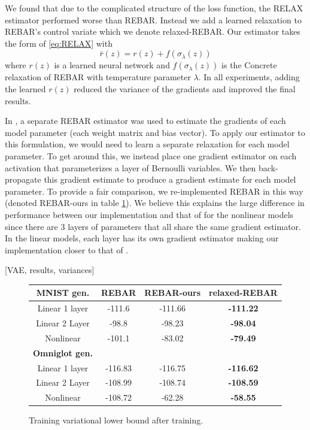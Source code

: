 \documentclass{article}
\newcommand{\relaxed}{r}
\begin{document}
We found that due to the complicated structure of the loss function, the RELAX estimator performed worse than REBAR. Instead we add a learned relaxation to REBAR's control variate which we denote relaxed-REBAR. Our estimator takes the form of \ref{eq:RELAX} with $$\bar \relaxed(z) = \relaxed(z) + f(\sigma_\lambda(z))$$ where $\relaxed(z)$ is a learned neural network and $f(\sigma_\lambda(z))$ is the Concrete relaxation of REBAR with temperature parameter $\lambda$. In all experiments, adding the learned $\relaxed(z)$ reduced the variance of the gradients and improved the final results. 

In \citep{tucker2017rebar}, a separate REBAR estimator was used to estimate the gradients of each model parameter (each weight matrix and bias vector). To apply our estimator to this formulation, we would need to learn a separate relaxation for each model parameter. To get around this, we instead place one gradient estimator on each activation that parameterizes a layer of Bernoulli variables. We then back-propagate this gradient estimate to produce a gradient estimate for each model parameter. To provide a fair comparison, we re-implemented REBAR in this way (denoted REBAR-ours in table \ref{tab:vae}). We believe this explains the large difference in performance between our implementation and that of \citep{tucker2017rebar} for the nonlinear models since there are 3 layers of parameters that all share the same gradient estimator. In the linear models, each layer has its own gradient estimator making our implementation closer to that of \citep{tucker2017rebar}.



[VAE, results, variances]
\begin{figure}
\begin{center}
 \begin{tabular}{|c|c c c||} 
 \hline
 \textbf{MNIST gen.} & REBAR \citep{tucker2017rebar} & REBAR-ours & relaxed-REBAR \\ [0.5ex] 
 \hline
 Linear 1 layer   & -111.6 & -111.66 & \textbf{-111.22} \\ 
 Linear 2 Layer & -98.8  & -98.23 & \textbf{-98.04} \\
 Nonlinear         & -101.1  &  -83.02 &  \textbf{-79.49} \\
 \hline\hline
 \textbf{Omniglot gen.} &&&\\
 \hline
 Linear 1 layer   & -116.83  & -116.75 & \textbf{-116.62} \\ 
 Linear 2 Layer & -108.99  & -108.74 & \textbf{-108.59} \\
 Nonlinear         & -108.72  & -62.28 & \textbf{-58.55} \\
 \hline
\end{tabular}
\end{center}
\label{tab:vae}
\caption{Training variational lower bound after training.}
\end{figure}
\end{document}
